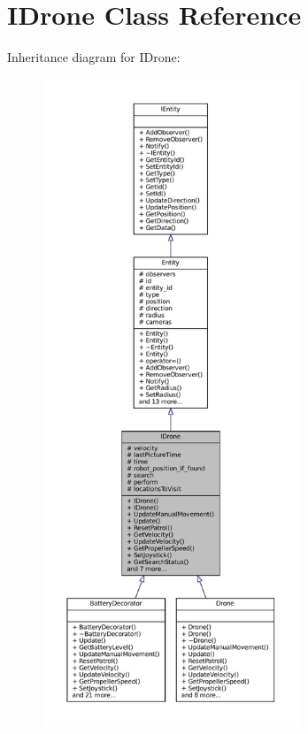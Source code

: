 \hypertarget{classIDrone}{}\section{I\+Drone Class Reference}
\label{classIDrone}


Inheritance diagram for I\+Drone\+:\nopagebreak
\begin{figure}[H]
\begin{center}
\leavevmode
\includegraphics[height=550pt]{classIDrone__inherit__graph}
\end{center}
\end{figure}


